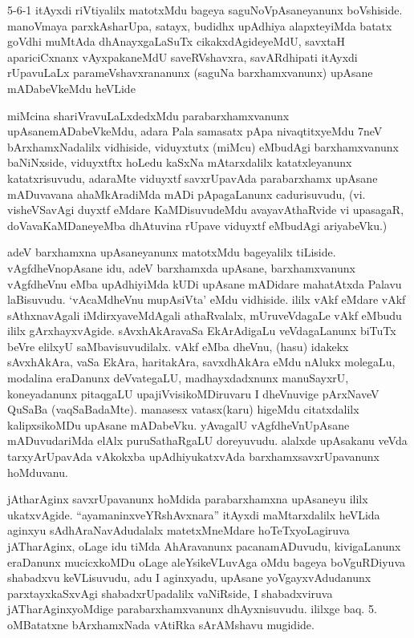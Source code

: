 \begin{artha}
5-6-1 itAyxdi riVtiyalilx matotxMdu bageya saguNoVpAsaneyanunx boVshiside. manoVmaya parxkAsharUpa, satayx, budidhx upAdhiya alapxteyiMda batatx goVdhi muMtAda dhAnayxgaLaSuTx cikakxdAgideyeMdU, savxtaH apariciCxnanx vAyxpakaneMdU saveRVshavxra, savARdhipati itAyxdi rUpavuLaLx parameVshavxrananunx (saguNa barxhamxvanunx) upAsane mADabeVkeMdu heVLide
\end{artha}

\begin{artha}
miMcina shariVravuLaLxdedxMdu parabarxhamxvanunx upAsanemADabeVkeMdu, adara Pala samasatx pApa nivaqtitxyeMdu 7neV bArxhamxNadalilx vidhiside, viduyxtutx (miMcu) eMbudAgi barxhamxvanunx baNiNxside, viduyxtftx hoLedu kaSxNa mAtarxdalilx katatxleyanunx katatxrisuvudu, adaraMte viduyxtf savxrUpavAda parabarxhamx upAsane mADuvavana ahaMkAradiMda mADi pApagaLanunx cadurisuvudu, (vi. visheVSavAgi duyxtf eMdare KaMDisuvudeMdu avayavAthaRvide vi upasagaR, doVavaKaMDaneyeMba dhAtuvina rUpave viduyxtf eMbudAgi ariyabeVku.)
\end{artha}

\begin{artha}
adeV barxhamxna upAsaneyanunx matotxMdu bageyalilx tiLiside. vAgfdheVnopAsane idu, adeV barxhamxda upAsane, barxhamxvanunx vAgfdheVnu eMba upAdhiyiMda kUDi upAsane mADidare mahatAtxda Palavu laBisuvudu. `vAcaMdheVnu mupAsiVta' eMdu vidhiside. ililx vAkf eMdare vAkf sAthxnavAgali iMdirxyaveMdAgali athaRvalalx, mUruveVdagaLe vAkf eMbudu ililx gArxhayxvAgide. sAvxhAkAravaSa EkArAdigaLu veVdagaLanunx biTuTx beVre elilxyU saMbavisuvudilalx. vAkf eMba dheVnu, (hasu) idakekx sAvxhAkAra, vaSa EkAra, haritakAra, savxdhAkAra eMdu nAlukx molegaLu, modalina eraDanunx deVvategaLU, madhayxdadxnunx manuSayxrU, koneyadanunx pitaqgaLU upajiVvisikoMDiruvaru I dheVnuvige pArxNaveV QuSaBa (vaqSaBadaMte). manasesx vatasx(karu) higeMdu citatxdalilx kalipxsikoMDu upAsane mADabeVku. yAvagalU vAgfdheVnUpAsane mADuvudariMda elAlx puruSathaRgaLU doreyuvudu. alalxde upAsakanu veVda tarxyArUpavAda vAkokxba upAdhiyukatxvAda barxhamxsavxrUpavanunx hoMduvanu.
\end{artha}

\begin{artha}
jAtharAginx savxrUpavanunx hoMdida parabarxhamxna upAsaneyu ililx ukatxvAgide. ``ayamaninxveYRshAvxnara'' itAyxdi maMtarxdalilx heVLida aginxyu sAdhAraNavAdudalalx matetxMneMdare hoTeTxyoLagiruva jATharAginx, oLage idu tiMda AhAravanunx pacanamADuvudu, kivigaLanunx eraDanunx mucicxkoMDu oLage aleYsikeVLuvAga oMdu bageya boVguRDiyuva shabadxvu keVLisuvudu, adu I aginxyadu, upAsane yoVgayxvAdudanunx parxtayxkaSxvAgi shabadxrUpadalilx vaNiRside, I shabadxviruva jATharAginxyoMdige parabarxhamxvanunx dhAyxnisuvudu. ililxge baq. 5. oMBatatxne bArxhamxNada vAtiRka sArAMshavu mugidide.
\end{artha}

